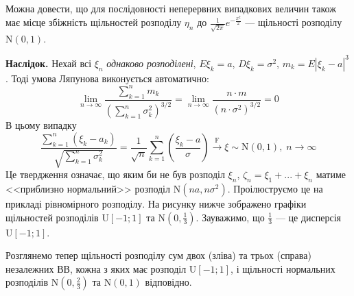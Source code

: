 \begin{remark}
    Можна довести, що для послідовності неперервних випадкових величин також має місце збіжність щільностей розподілу $\eta_n$ до $\frac{1}{\sqrt{2\pi}} e^{-\frac{x^2}{2}}$
    --- щільності розподілу $\mathrm{N}(0, 1)$.
\end{remark}
\noindent\textbf{Наслідок.} Нехай всі $\xi_n$ \emph{однаково розподілені}, $E\xi_k = a$, $D\xi_k = \sigma^2$,
$m_k = E\left| \xi_k - a\right|^3$. Тоді умова Ляпунова виконується автоматично:
$$\underset{n \rightarrow \infty}{\lim} \frac{\sum\limits_{k=1}^n m_k}{\left(
    \sum\limits_{k=1}^n \sigma_k^2
\right)^{3/2}} = \underset{n \rightarrow \infty}{\lim} \frac{n \cdot m}{(n\cdot \sigma^2)^{3/2}} = 0$$
В цьому випадку
$$\frac{\sum\limits_{k=1}^n (\xi_k - a_k)}
{\sqrt{\sum\limits_{k=1}^n \sigma_k^2}}
= \frac{1}{\sqrt{n}} \sum\limits_{k=1}^n \left( \frac{\xi_k - a}{\sigma}\right) \overset{\mathrm{F}}{\longrightarrow}\xi \sim \mathrm{N}(0, 1),
\;n \to \infty$$
Це твердження означає, що яким би не був розподіл $\xi_n$, $\zeta_n  = \xi_1 + ... + \xi_n$ матиме <<приблизно нормальний>> розподіл $\mathrm{N}(n a, n\sigma^2)$.
Проілюструємо це на прикладі рівномірного розподілу. На рисунку нижче зображено графіки щільностей розподілів
$\mathrm{U}[-1; 1]$ та $\mathrm{N}\left(0, \frac{1}{3}\right)$. Зауважимо, що $\frac{1}{3}$ --- це дисперсія $\mathrm{U}[-1; 1]$.
\begin{center}
\end{center}
Розглянемо тепер щільності розподілу сум двох (зліва) та трьох (справа) незалежних ВВ, кожна з яких має розподіл $\mathrm{U}[-1; 1]$, і щільності
нормальних розподілів $\mathrm{N}\left(0, \frac{2}{3}\right)$ та $\mathrm{N}\left(0, 1\right)$ відповідно.

